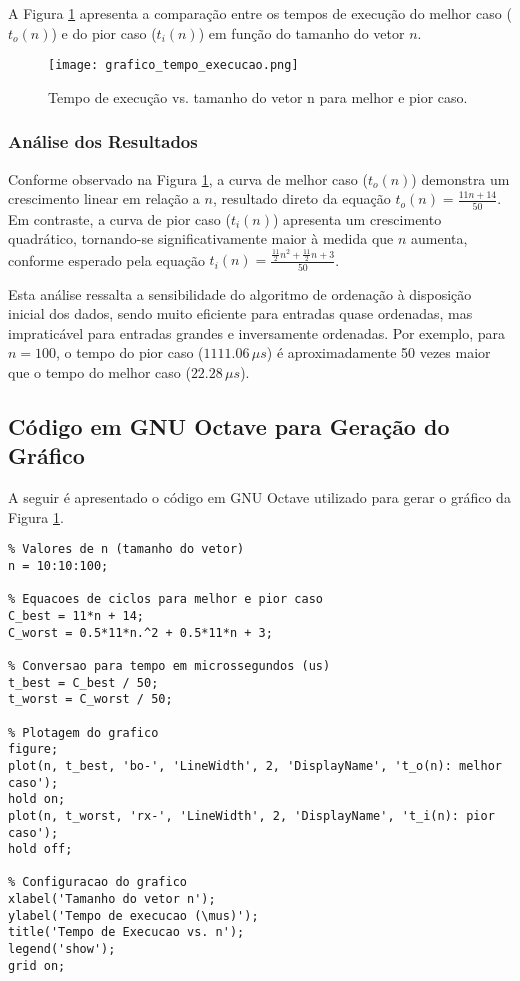 \documentclass[12pt,a4paper]{article}
\begin{document}
A Figura \ref{fig:tempo_execucao} apresenta a comparação entre os tempos de execução do melhor caso ($t_o(n)$) e do pior caso ($t_i(n)$) em função do tamanho do vetor $n$.

\begin{figure}[H]
\centering
\texttt{[image: grafico\_tempo\_execucao.png]}
\caption{Tempo de execução vs. tamanho do vetor n para melhor e pior caso.}
\label{fig:tempo_execucao}
\end{figure}

\subsubsection*{Análise dos Resultados}

Conforme observado na Figura \ref{fig:tempo_execucao}, a curva de melhor caso ($t_o(n)$) demonstra um crescimento linear em relação a $n$, resultado direto da equação $t_o(n) = \frac{11n + 14}{50}$. Em contraste, a curva de pior caso ($t_i(n)$) apresenta um crescimento quadrático, tornando-se significativamente maior à medida que $n$ aumenta, conforme esperado pela equação $t_i(n) = \frac{\frac{11}{2}n^{2} + \frac{11}{2}n + 3}{50}$. 

Esta análise ressalta a sensibilidade do algoritmo de ordenação à disposição inicial dos dados, sendo muito eficiente para entradas quase ordenadas, mas impraticável para entradas grandes e inversamente ordenadas. Por exemplo, para $n=100$, o tempo do pior caso ($1111.06\,\mu s$) é aproximadamente 50 vezes maior que o tempo do melhor caso ($22.28\,\mu s$).

\subsection*{Código em GNU Octave para Geração do Gráfico}

A seguir é apresentado o código em GNU Octave utilizado para gerar o gráfico da Figura \ref{fig:tempo_execucao}.

\begin{verbatim}
% Valores de n (tamanho do vetor)
n = 10:10:100;

% Equacoes de ciclos para melhor e pior caso
C_best = 11*n + 14;
C_worst = 0.5*11*n.^2 + 0.5*11*n + 3;

% Conversao para tempo em microssegundos (us)
t_best = C_best / 50;
t_worst = C_worst / 50;

% Plotagem do grafico
figure;
plot(n, t_best, 'bo-', 'LineWidth', 2, 'DisplayName', 't_o(n): melhor caso');
hold on;
plot(n, t_worst, 'rx-', 'LineWidth', 2, 'DisplayName', 't_i(n): pior caso');
hold off;

% Configuracao do grafico
xlabel('Tamanho do vetor n');
ylabel('Tempo de execucao (\mus)');
title('Tempo de Execucao vs. n');
legend('show');
grid on;
\end{verbatim}
\end{document}
